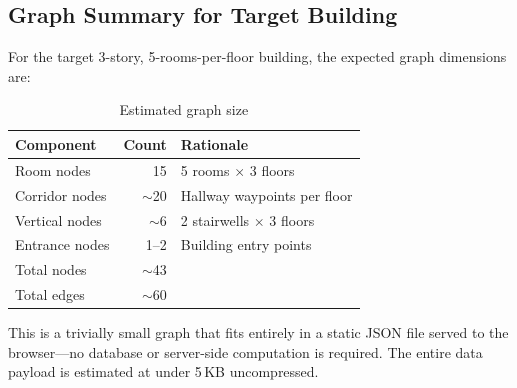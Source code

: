 \subsection{Graph Summary for Target Building}

For the target 3-story, 5-rooms-per-floor building, the expected graph dimensions are:

\begin{table}[H]
\centering
\caption{Estimated graph size}
\begin{tabular}{lrl}
\toprule
\textbf{Component} & \textbf{Count} & \textbf{Rationale} \\
\midrule
Room nodes     & 15 & 5 rooms $\times$ 3 floors \\
Corridor nodes & $\sim$20 & Hallway waypoints per floor \\
Vertical nodes & $\sim$6 & 2 stairwells $\times$ 3 floors \\
Entrance nodes & 1--2 & Building entry points \\
\midrule
Total nodes    & $\sim$43 & \\
Total edges    & $\sim$60 & \\
\bottomrule
\end{tabular}
\end{table}

This is a trivially small graph that fits entirely in a static JSON file served to the browser---no database or server-side computation is required. The entire data payload is estimated at under 5\,KB uncompressed.
